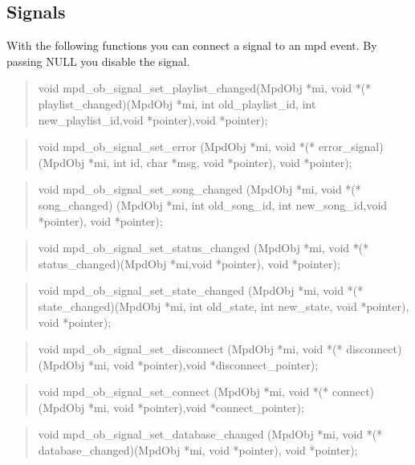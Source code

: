 \documentclass[a4paper,11pt]{article}
\begin{document}
\subsection{Signals}

With the following functions you can connect a signal to an mpd event. By passing NULL you disable the signal.\\

\begin{quote}
void mpd\_ob\_signal\_set\_playlist\_changed(MpdObj *mi, void *(* playlist\_changed)(MpdObj *mi, int old\_playlist\_id, int new\_playlist\_id,void *pointer),void *pointer);
\end{quote}

\begin{quote}
void   mpd\_ob\_signal\_set\_error   
(MpdObj *mi, void *(* error\_signal)(MpdObj *mi, int id, char *msg, void *pointer),
void *pointer);
\end{quote}

\begin{quote}
void   mpd\_ob\_signal\_set\_song\_changed  
(MpdObj *mi, void *(* song\_changed)
(MpdObj *mi, int old\_song\_id, int new\_song\_id,void *pointer), 
void *pointer);
\end{quote}

\begin{quote}
void   mpd\_ob\_signal\_set\_status\_changed 
(MpdObj *mi, void *(* status\_changed)(MpdObj *mi,void *pointer), void *pointer);
\end{quote}

\begin{quote}
void   mpd\_ob\_signal\_set\_state\_changed  
(MpdObj *mi, void *(* state\_changed)(MpdObj *mi, int old\_state, int new\_state, void *pointer),
void *pointer);
\end{quote}

\begin{quote}
void   mpd\_ob\_signal\_set\_disconnect  
(MpdObj *mi, void *(* disconnect)(MpdObj *mi, void *pointer),void *disconnect\_pointer);

\end{quote}

\begin{quote}
void   mpd\_ob\_signal\_set\_connect  
(MpdObj *mi, void *(* connect)(MpdObj *mi, void *pointer),void *connect\_pointer);
\end{quote}

\begin{quote}
void   mpd\_ob\_signal\_set\_database\_changed 
(MpdObj *mi, void *(* database\_changed)(MpdObj *mi, void *pointer), void *pointer);
\end{quote}
\end{document}
